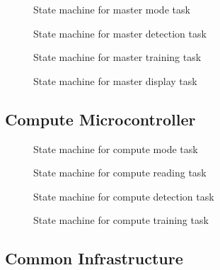 \documentclass{article}
\begin{document}
\begin{figure}[H]
  \centering
  \caption{State machine for master mode task}
  
  \label{sm:1}
\end{figure}

\begin{figure}[H]
  \centering
  \caption{State machine for master detection task}
  
  \label{sm:2}
\end{figure}

\begin{figure}[H]
  \centering
  \caption{State machine for master training task}
  
  \label{sm:3}
\end{figure}

\begin{figure}[H]
  \centering
  \caption{State machine for master display task}
  
  \label{sm:4}
\end{figure}

\subsection{Compute Microcontroller}
\label{app.sm.compute}

\begin{figure}[H]
  \centering
  \caption{State machine for compute mode task}
  
  \label{sm:5}
\end{figure}

\begin{figure}[H]
  \centering
  \caption{State machine for compute reading task}
  
  \label{sm:6}
\end{figure}

\begin{figure}[H]
  \centering
  \caption{State machine for compute detection task}
  
  \label{sm:7}
\end{figure}

\begin{figure}[H]
  \centering
  \caption{State machine for compute training task}
  
  \label{sm:8}
\end{figure}

\subsection{Common Infrastructure}
\label{app.sm.common}
\end{document}
